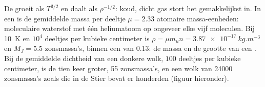 De  groeit als $T^{3/2}$ en daalt als $\rho^{-1/2}$: koud, dicht gas
stort het gemakkelijkst in. In een  is de gemiddelde massa per deeltje
$\mu = 2.33$ atomaire massa-eenheden: moleculaire waterstof met één heliumatoom op
ongeveer elke vijf moleculen. Bij \qty{10}{K} en $10^4$ deeltjes per kubieke
centimeter is $\rho = \mu m_u n = \qty{3.87e-17}{kg.m^{-3}}$ en
$M_J = 5.5$ zonsmassa's, binnen een  van \qty{0.13}{\parsec}:
de massa en de grootte van een . Bij de gemiddelde dichtheid van een donkere wolk,
$100$ deeltjes per kubieke centimeter, is de  tien keer groter, 55
zonsmassa's, en een wolk van \num{24000} zonsmassa's zoals die in de Stier bevat er
honderden (figuur hieronder).

